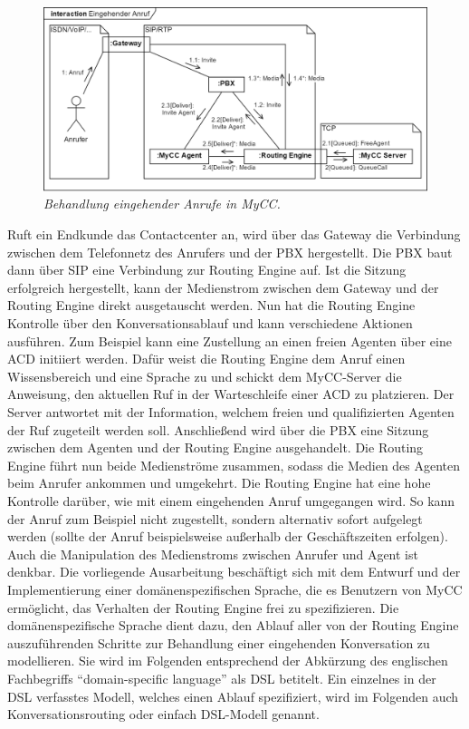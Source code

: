 \begin{figure} %
	\centering
		\includegraphics[width=\textwidth]{img/RoutingEngineSipExplanation.png}
	\caption[Behandlung eingehender Rufe in MyCC]{\textit{Behandlung eingehender Anrufe in MyCC.}}
	\label{fig:InteractionIncomingCall}
\end{figure}
\noindent Ruft ein Endkunde das Contactcenter an, wird über das Gateway die Verbindung zwischen dem Telefonnetz des Anrufers und der PBX hergestellt. Die PBX baut dann über SIP eine Verbindung zur Routing Engine auf. Ist die Sitzung erfolgreich hergestellt, kann der Medienstrom zwischen dem Gateway und der Routing Engine direkt ausgetauscht werden. Nun hat die Routing Engine Kontrolle über den Konversationsablauf und kann verschiedene Aktionen ausführen. Zum Beispiel kann eine Zustellung an einen freien Agenten über eine ACD initiiert werden. Dafür weist die Routing Engine dem Anruf einen Wissensbereich und eine Sprache zu und schickt dem MyCC-Server die Anweisung, den aktuellen Ruf in der Warteschleife einer ACD zu platzieren. Der Server antwortet mit der Information, welchem freien und qualifizierten Agenten der Ruf zugeteilt werden soll. Anschließend wird über die PBX eine Sitzung zwischen dem Agenten und der Routing Engine ausgehandelt. Die Routing Engine führt nun beide Medienströme zusammen, sodass die Medien des Agenten beim Anrufer ankommen und umgekehrt. 
\newline
Die Routing Engine hat eine hohe Kontrolle darüber, wie mit einem eingehenden Anruf umgegangen wird. So kann der Anruf zum Beispiel nicht zugestellt, sondern alternativ sofort aufgelegt werden (sollte der Anruf beispielsweise außerhalb der Geschäftszeiten erfolgen). Auch die Manipulation des Medienstroms zwischen Anrufer und Agent ist denkbar. Die vorliegende Ausarbeitung beschäftigt sich mit dem Entwurf und der Implementierung einer domänenspezifischen Sprache, die es Benutzern von MyCC ermöglicht, das Verhalten der Routing Engine frei zu spezifizieren. Die domänenspezifische Sprache dient dazu, den Ablauf aller von der Routing Engine auszuführenden Schritte zur Behandlung einer eingehenden Konversation zu modellieren. Sie wird im Folgenden entsprechend der Abkürzung des englischen Fachbegriffs ``domain-specific language'' als DSL betitelt. Ein einzelnes in der DSL verfasstes Modell, welches einen Ablauf spezifiziert, wird im Folgenden auch Konversationsrouting oder einfach DSL-Modell genannt.
 
